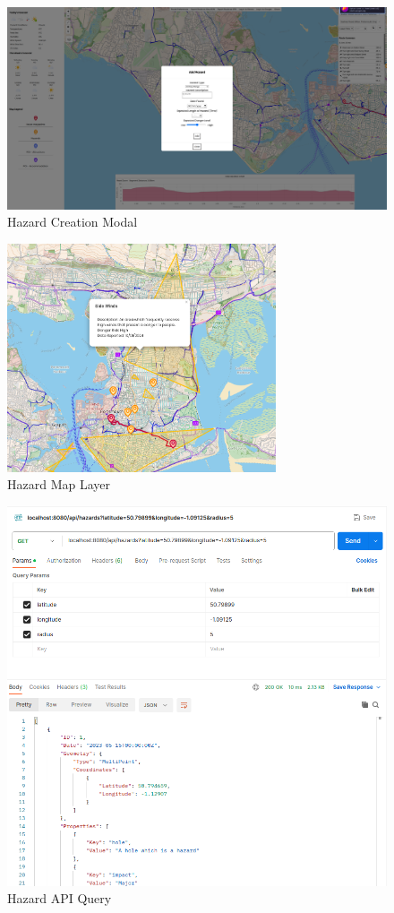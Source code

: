 \begin{figure}[!ht]
  \centering
  \includegraphics[width=425px]{figures/Progress Images/Iteration-2/SR32-37/sr32-add-hazard-point.png}
  \caption{Hazard Creation Modal}
  \label{fig:hazard-creation}
\end{figure}

\begin{figure}[!ht]
  \centering
  \includegraphics[width=300px]{figures/Progress Images/Iteration-2/SR32-37/sr32-hazard-popup.png}
  \caption{Hazard Map Layer}
  \label{fig:hazard-layer}
\end{figure}

\begin{figure}[!ht]
  \centering
  \includegraphics[width=425px]{figures/Progress Images/Iteration-2/SR32-37/SR32 - Basic API further developed.png}
  \caption{Hazard API Query}
  \label{fig:hazard-API}
\end{figure}

